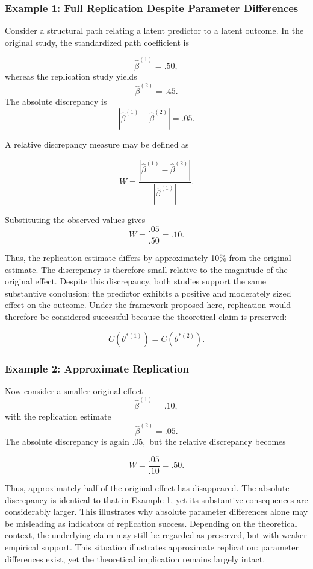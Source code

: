 \documentclass[
  12pt,
  letterpaper,
  man]{apa7}
\begin{document}
\subsubsection{Example 1: Full Replication Despite Parameter
Differences}\label{example-1-full-replication-despite-parameter-differences}

Consider a structural path relating a latent predictor to a latent
outcome. In the original study, the standardized path coefficient is

\[\hat{\beta}^{(1)} = .50,\] whereas the replication study yields
\[\hat{\beta}^{(2)} = .45.\] The absolute discrepancy is
\[\left|\hat{\beta}^{(1)}-\hat{\beta}^{(2)}\right|=.05.\]

A relative discrepancy measure may be defined as

\[
W=
\frac{\left|\hat{\beta}^{(1)}-\hat{\beta}^{(2)}\right|}
{\left|\hat{\beta}^{(1)}\right|}.
\]

Substituting the observed values gives \[W= \frac{.05}{.50} = .10.\]

Thus, the replication estimate differs by approximately 10\% from the
original estimate. The discrepancy is therefore small relative to the
magnitude of the original effect. Despite this discrepancy, both studies
support the same substantive conclusion: the predictor exhibits a
positive and moderately sized effect on the outcome. Under the framework
proposed here, replication would therefore be considered successful
because the theoretical claim is preserved:

\[
C\left(\theta^{*(1)}\right) = C\left(\theta^{*(2)}\right).
\]

\subsubsection{Example 2: Approximate
Replication}\label{example-2-approximate-replication}

Now consider a smaller original effect \[\hat{\beta}^{(1)}=.10,\] with
the replication estimate \[\hat{\beta}^{(2)}=.05.\] The absolute
discrepancy is again \(.05,\) but the relative discrepancy becomes

\[
W= \frac{.05}{.10} = .50.
\]

Thus, approximately half of the original effect has disappeared. The
absolute discrepancy is identical to that in Example 1, yet its
substantive consequences are considerably larger. This illustrates why
absolute parameter differences alone may be misleading as indicators of
replication success. Depending on the theoretical context, the
underlying claim may still be regarded as preserved, but with weaker
empirical support. This situation illustrates approximate replication:
parameter differences exist, yet the theoretical implication remains
largely intact.
\end{document}
